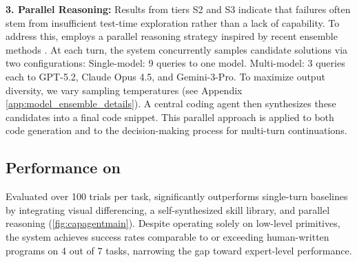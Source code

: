\textbf{3. Parallel Reasoning:}
Results from tiers S2 and S3 indicate that failures often stem from insufficient test-time exploration rather than a lack of capability. To address this, \sysname{} employs a parallel reasoning strategy inspired by recent ensemble methods \cite{pan2025learning, jin2025learning, rodionov2025hogwild}. At each turn, the system concurrently samples candidate solutions via two configurations: Single-model: 9 queries to one model. Multi-model: 3 queries each to GPT-5.2, Claude Opus 4.5, and Gemini-3-Pro. To maximize output diversity, we vary sampling temperatures (see Appendix \ref{app:model_ensemble_details}). A central coding agent then synthesizes these candidates into a final code snippet. This parallel approach is applied to both code generation and to the decision-making process for multi-turn continuations.




\subsection{\sysname{} Performance on \benchname{}}
Evaluated over 100 trials per task, \sysname{} significantly outperforms single-turn baselines by integrating visual differencing, a self-synthesized skill library, and parallel reasoning (\cref{fig:capagentmain}). Despite operating solely on low-level primitives, the system achieves success rates comparable to or exceeding human-written programs on 4 out of 7 tasks, narrowing the gap toward expert-level performance.



